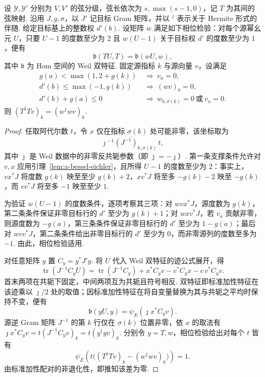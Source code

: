\begin{lemma}
\label{lem:a-bessel-eichler-gram}
\emitthmsource
设 $\mathcal Y,\mathcal Y'$ 分别为 $V,V'$ 的弦分级，弦长依次为 $s,\max(s-1,0)$，记 $T$ 为其间的弦映射. 沿用 $J,g,\sigma$，以 $J'$ 记目标 Gram 矩阵，并以 $^\dagger$ 表示关于 Hermite 形式的伴随. 给定目标基上的整数权 $d'(b)$. 设矩阵 $w$ 满足如下相位检验：对每个源幂幺元 $U$，只要 $U-1$ 的度数至少为 $2$ 且 $w(U-1)$ 关于目标权 $d'$ 的度数至少为 $1$，便有
\[
 \mathfrak b(TU,T)=\mathfrak b(wU,w),
\]
其中 $\mathfrak b$ 为 Hom 空间的 Weil 双特征. 固定源指标 $k$ 与源向量 $v$，设满足
\[
 \begin{aligned}
 g(a)<\max(1,2+g(k))&\ \Longrightarrow\ v_a=0,\\
 d'(b)\le\max(-1,g(k))&\ \Longrightarrow\ (wv)_b=0,\\
 d'(b)+g(a)\le0&\ \Longrightarrow\ 
                        w_{b,\sigma(k)}=0\ \text{或}\ v_a=0 .
 \end{aligned}
\]
则 $(T^\dagger T v)_k=(w^\dagger wv)_k$.
\end{lemma}
\begin{proof}
任取阿代尔数 $t$，令 $x$ 仅在指标 $\sigma(k)$ 处可能非零，该坐标取为
\[
  \overline{\jmath{}^{-1}(J^{-1})_{k,\sigma(k)}\,t},
\]
其中 $\jmath{}$ 是 Weil 数据中的非零反共轭参数（即 $\bar{\jmath{}}=-\jmath{}$）. 第一条支撑条件允许对 $v,x$ 应用引理~\ref{lem:a-bessel-eichler}，且所得 $U-1$ 的度数至少为 $2$：事实上，$v x^\ast J$ 将度数 $g(k)$ 映至至少 $g(k)+2$，$x v^\ast J$ 将至多 $-g(k)-2$ 映至 $-g(k)$，而 $v v^\ast J$ 将至多 $-1$ 映至至少 $1$.

为验证 $w(U-1)$ 的度数条件，逐项考察其三项：对 $wv x^\ast J$，源度数为 $g(k)$，第二条条件保证非零目标行的 $d'$ 至少为 $g(k)+1$；对 $wx v^\ast J$，若 $v_a$ 贡献非零，则源度数为 $-g(a)$，第三条条件保证非零目标行的 $d'$ 至少为 $1-g(a)$；最后对 $wv v^\ast J$，第二条条件给出非零目标行的 $d'$ 至少为 $0$，而非零源列的度数至多为 $-1$. 由此，相位检验适用.

对任意矩阵 $y$ 置 $C_y=y^\ast J'y$. 将 $U$ 代入 Weil 双特征的迹公式展开，得
\[
 \operatorname{tr}(J^{-1}C_yU)
 =\operatorname{tr}(J^{-1}C_y)
      +x^\ast C_yv-v^\ast C_yx-c\,v^\ast C_yv .
\]
首末两项在共轭下固定，中间两项互为共轭且符号相反. 双特征即标准加性特征在该迹乘以 $\jmath{}/2$ 处的取值；因标准加性特征在将自变量替换为其与共轭之平均时保持不变，便有
\[
 \mathfrak b(yU,y)=\psi_E(\jmath{} x^\ast C_yv).
\]
源逆 Gram 矩阵 $J^{-1}$ 的第 $k$ 行仅在 $\sigma(k)$ 位置非零，依 $x$ 的取法有 $\jmath{} x^\ast C_yv=t(J^{-1}C_yv)_k=t(y^\dagger y v)_k$. 分别令 $y=T,w$，相位检验给出对每个 $t$ 皆有
\[
  \psi_E\!\left(t\bigl((T^\dagger Tv)_k-(w^\dagger wv)_k\bigr)\right)=1 .
\]
由标准加性配对的非退化性，即推知该差为零.
\end{proof}

